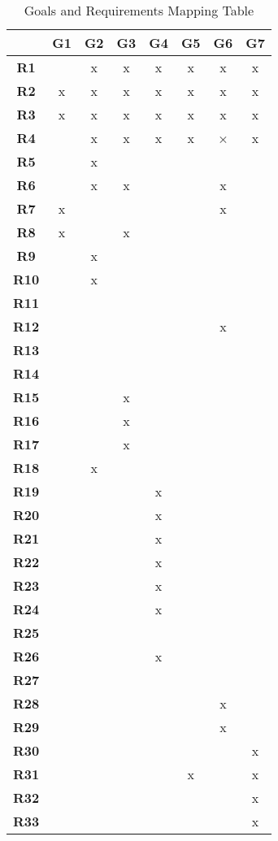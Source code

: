 \begin{table}[H] \centering \begin{tabular}{|c|c|c|c|c|c|c|c|} \hline &
\textbf{G1} &
\textbf{G2} &
\textbf{G3} &
\textbf{G4} &
\textbf{G5} &
\textbf{G6} &
\textbf{G7} \\ \hline
\textbf{R1}  &  & x & x & x & x & x & x \\ \hline
\textbf{R2}  & x & x & x & x & x & x & x \\ \hline
\textbf{R3}  & x & x & x & x & x & x & x \\ \hline
\textbf{R4}  &  & x & x & x & x & × & x \\ \hline
\textbf{R5}  &  & x &  &  &  &  &  \\ \hline
\textbf{R6}  &  & x & x &  &  & x &  \\ \hline
\textbf{R7}  & x &  &  &  &  & x &  \\ \hline
\textbf{R8}  & x &  & x &  &  &  &  \\ \hline
\textbf{R9}  &  & x &  &  &  &  &  \\ \hline
\textbf{R10} &  & x &  &  &  &  &  \\ \hline
\textbf{R11} &  &  &  &  &  &  &  \\ \hline
\textbf{R12} &  &  &  &  &  & x &  \\ \hline
\textbf{R13} &  &  &  &  &  &  &  \\ \hline
\textbf{R14} &  &  &  &  &  &  &  \\ \hline
\textbf{R15} &  &  & x &  &  &  &  \\ \hline
\textbf{R16} &  &  & x &  &  &  &  \\ \hline
\textbf{R17} &  &  & x &  &  &  &  \\ \hline
\textbf{R18} &  & x &  &  &  &  &  \\ \hline
\textbf{R19} &  &  &  & x &  &  &  \\ \hline
\textbf{R20} &  &  &  & x &  &  &  \\ \hline
\textbf{R21} &  &  &  & x &  &  &  \\ \hline
\textbf{R22} &  &  &  & x &  &  &  \\ \hline
\textbf{R23} &  &  &  & x &  &  &  \\ \hline
\textbf{R24} &  &  &  & x &  &  &  \\ \hline
\textbf{R25} &  &  &  &  &  &  &  \\ \hline
\textbf{R26} &  &  &  & x &  &  &  \\ \hline
\textbf{R27} &  &  &  &  &  &  &  \\ \hline
\textbf{R28} &  &  &  &  &  & x &  \\ \hline
\textbf{R29} &  &  &  &  &  & x &  \\ \hline
\textbf{R30} &  &  &  &  &  &  & x \\ \hline
\textbf{R31} &  &  &  &  & x &  & x \\ \hline
\textbf{R32} &  &  &  &  &  &  & x \\ \hline
\textbf{R33} &  &  &  &  &  &  & x \\ \hline
\end{tabular}
\caption{Goals and Requirements Mapping Table} \label{tab:reuirements_mapping}
\end{table}

